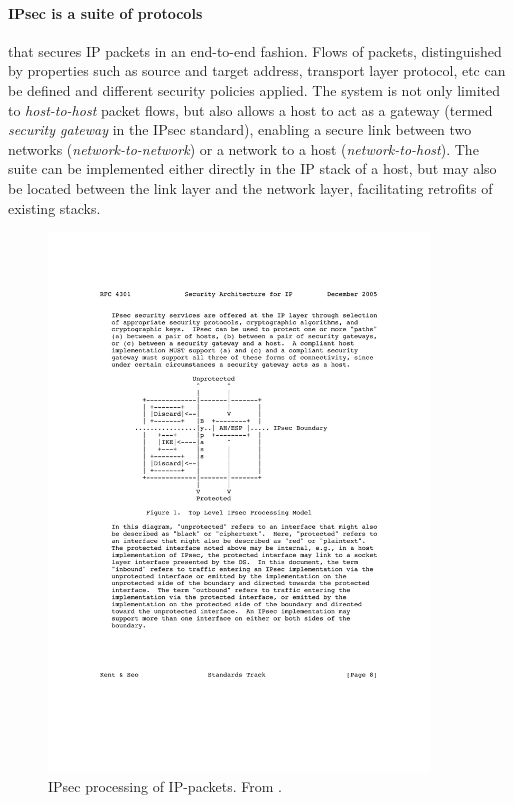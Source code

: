 \documentclass[final,a4paper,twoside,11pt,onecolumn]{report}
\begin{document}
\paragraph{IPsec is a suite of protocols} that secures IP packets in an end-to-end fashion. Flows of packets, distinguished by properties such as source and target address, transport layer protocol, etc can be defined and different security policies applied. The system is not only limited to \emph{host-to-host} packet flows, but also allows a host to act as a gateway (termed \emph{security gateway} in the IPsec standard), enabling a secure link between two networks (\emph{network-to-network}) or a network to a host (\emph{network-to-host}). The suite can be implemented either directly in the IP stack of a host, but may also be located between the link layer and the network layer\citep[section 3.3]{rfc4301}, facilitating retrofits of existing stacks.

\begin{figure}[h!]
   \includegraphics[width=0.9\textwidth]{ipsec-flow}
   \caption{IPsec processing of IP-packets. From \citep[p.8]{rfc4301}.}
   \label{fig:ipsec-flow}
\end{figure}
\end{document}

